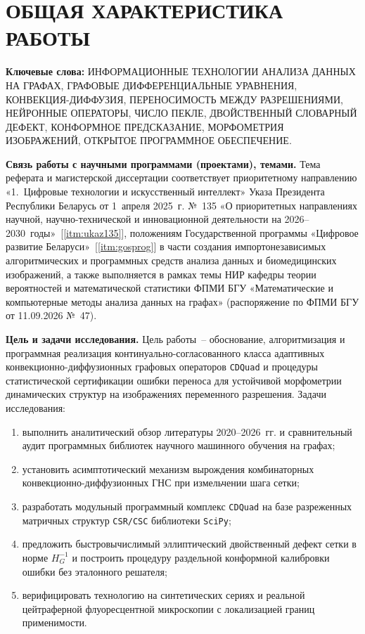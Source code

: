 \newpage

\chapter*{\large ОБЩАЯ ХАРАКТЕРИСТИКА РАБОТЫ}

\textbf{Ключевые слова:} ИНФОРМАЦИОННЫЕ ТЕХНОЛОГИИ АНАЛИЗА ДАННЫХ НА ГРАФАХ, ГРАФОВЫЕ ДИФФЕРЕНЦИАЛЬНЫЕ УРАВНЕНИЯ, КОНВЕКЦИЯ-ДИФФУЗИЯ, ПЕРЕНОСИМОСТЬ МЕЖДУ РАЗРЕШЕНИЯМИ, НЕЙРОННЫЕ ОПЕРАТОРЫ, ЧИСЛО ПЕКЛЕ, ДВОЙСТВЕННЫЙ СЛОВАРНЫЙ ДЕФЕКТ, КОНФОРМНОЕ ПРЕДСКАЗАНИЕ, МОРФОМЕТРИЯ ИЗОБРАЖЕНИЙ, ОТКРЫТОЕ ПРОГРАММНОЕ ОБЕСПЕЧЕНИЕ.

\textbf{Связь работы с научными программами (проектами), темами.} Тема реферата и магистерской диссертации соответствует приоритетному направлению «1.~Цифровые технологии и искусственный интеллект» Указа Президента Республики Беларусь от 1~апреля 2025~г. №~135 «О приоритетных направлениях научной, научно-технической и инновационной деятельности на 2026--2030~годы»~[\ref{itm:ukaz135}], положениям Государственной программы «Цифровое развитие Беларуси»~[\ref{itm:gosprog}] в части создания импортонезависимых алгоритмических и программных средств анализа данных и биомедицинских изображений, а также выполняется в рамках темы НИР кафедры теории вероятностей и математической статистики ФПМИ БГУ «Математические и компьютерные методы анализа данных на графах» (распоряжение по ФПМИ БГУ от 11.09.2026 №~47).

\textbf{Цель и задачи исследования.} Цель работы~-- обоснование, алгоритмизация и программная реализация континуально-согласованного класса адаптивных конвекционно-диффузионных графовых операторов \texttt{CDQuad} и процедуры статистической сертификации ошибки переноса для устойчивой морфометрии динамических структур на изображениях переменного разрешения. Задачи исследования:
\begin{enumerate}
    \item выполнить аналитический обзор литературы 2020--2026~гг. и сравнительный аудит программных библиотек научного машинного обучения на графах;
    \item установить асимптотический механизм вырождения комбинаторных конвекционно-диффузионных ГНС при измельчении шага сетки;
    \item разработать модульный программный комплекс \texttt{CDQuad} на базе разреженных матричных структур \texttt{CSR/CSC} библиотеки \texttt{SciPy};
    \item предложить быстровычислимый эллиптический двойственный дефект сетки в норме $H_G^{-1}$ и построить процедуру раздельной конформной калибровки ошибки без эталонного решателя;
    \item верифицировать технологию на синтетических сериях и реальной цейтраферной флуоресцентной микроскопии с локализацией границ применимости.
\end{enumerate}

